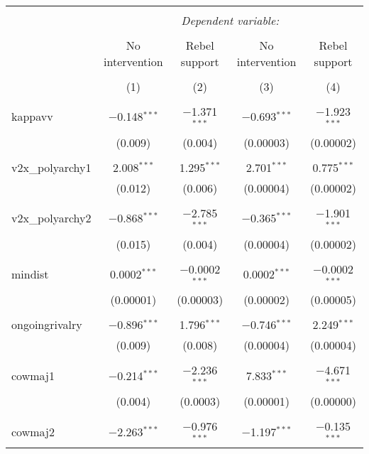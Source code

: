 
\begin{table}[!htbp] \centering 
  \caption{} 
  \label{} 
\begin{tabular}{@{\extracolsep{5pt}}lcccc} 
\\[-1.8ex]\hline 
\hline \\[-1.8ex] 
 & \multicolumn{4}{c}{\textit{Dependent variable:}} \\ 
\cline{2-5} 
\\[-1.8ex] & No intervention & Rebel support & No intervention & Rebel support \\ 
\\[-1.8ex] & (1) & (2) & (3) & (4)\\ 
\hline \\[-1.8ex] 
 kappavv & $-$0.148$^{***}$ & $-$1.371$^{***}$ & $-$0.693$^{***}$ & $-$1.923$^{***}$ \\ 
  & (0.009) & (0.004) & (0.00003) & (0.00002) \\ 
  & & & & \\ 
 v2x\_polyarchy1 & 2.008$^{***}$ & 1.295$^{***}$ & 2.701$^{***}$ & 0.775$^{***}$ \\ 
  & (0.012) & (0.006) & (0.00004) & (0.00002) \\ 
  & & & & \\ 
 v2x\_polyarchy2 & $-$0.868$^{***}$ & $-$2.785$^{***}$ & $-$0.365$^{***}$ & $-$1.901$^{***}$ \\ 
  & (0.015) & (0.004) & (0.00004) & (0.00002) \\ 
  & & & & \\ 
 mindist & 0.0002$^{***}$ & $-$0.0002$^{***}$ & 0.0002$^{***}$ & $-$0.0002$^{***}$ \\ 
  & (0.00001) & (0.00003) & (0.00002) & (0.00005) \\ 
  & & & & \\ 
 ongoingrivalry & $-$0.896$^{***}$ & 1.796$^{***}$ & $-$0.746$^{***}$ & 2.249$^{***}$ \\ 
  & (0.009) & (0.008) & (0.00004) & (0.00004) \\ 
  & & & & \\ 
 cowmaj1 & $-$0.214$^{***}$ & $-$2.236$^{***}$ & 7.833$^{***}$ & $-$4.671$^{***}$ \\ 
  & (0.004) & (0.0003) & (0.00001) & (0.00000) \\ 
  & & & & \\ 
 cowmaj2 & $-$2.263$^{***}$ & $-$0.976$^{***}$ & $-$1.197$^{***}$ & $-$0.135$^{***}$ \\ 

\end{tabular}
\end{table}
